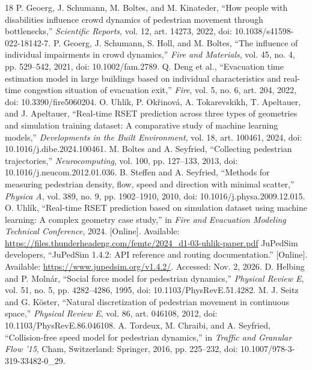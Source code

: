 \documentclass[conference]{IEEEtran}
\begin{document}
\begin{thebibliography}{18}
 P. Geoerg, J. Schumann, M. Boltes, and M. Kinateder, ``How people with disabilities influence crowd dynamics of pedestrian movement through bottlenecks,'' \textit{Scientific Reports}, vol. 12, art. 14273, 2022, doi: 10.1038/s41598-022-18142-7.
 P. Geoerg, J. Schumann, S. Holl, and M. Boltes, ``The influence of individual impairments in crowd dynamics,'' \textit{Fire and Materials}, vol. 45, no. 4, pp. 529--542, 2021, doi: 10.1002/fam.2789.
 Q. Deng et al., ``Evacuation time estimation model in large buildings based on individual characteristics and real-time congestion situation of evacuation exit,'' \textit{Fire}, vol. 5, no. 6, art. 204, 2022, doi: 10.3390/fire5060204.
 O. Uhl\'{i}k, P. Ok\v{r}inov\'{a}, A. Tokarevskikh, T. Apeltauer, and J. Apeltauer, ``Real-time RSET prediction across three types of geometries and simulation training dataset: A comparative study of machine learning models,'' \textit{Developments in the Built Environment}, vol. 18, art. 100461, 2024, doi: 10.1016/j.dibe.2024.100461.
 M. Boltes and A. Seyfried, ``Collecting pedestrian trajectories,'' \textit{Neurocomputing}, vol. 100, pp. 127--133, 2013, doi: 10.1016/j.neucom.2012.01.036.
 B. Steffen and A. Seyfried, ``Methods for measuring pedestrian density, flow, speed and direction with minimal scatter,'' \textit{Physica A}, vol. 389, no. 9, pp. 1902--1910, 2010, doi: 10.1016/j.physa.2009.12.015.
 O. Uhl\'{i}k, ``Real-time RSET prediction based on simulation dataset using machine learning: A complex geometry case study,'' in \textit{Fire and Evacuation Modeling Technical Conference}, 2024. [Online]. Available: \url{https://files.thunderheadeng.com/femtc/2024_d1-03-uhlik-paper.pdf}
 JuPedSim developers, ``JuPedSim 1.4.2: API reference and routing documentation.'' [Online]. Available: \url{https://www.jupedsim.org/v1.4.2/}. Accessed: Nov. 2, 2026.
 D. Helbing and P. Moln\'{a}r, ``Social force model for pedestrian dynamics,'' \textit{Physical Review E}, vol. 51, no. 5, pp. 4282--4286, 1995, doi: 10.1103/PhysRevE.51.4282.
 M. J. Seitz and G. K\"oster, ``Natural discretization of pedestrian movement in continuous space,'' \textit{Physical Review E}, vol. 86, art. 046108, 2012, doi: 10.1103/PhysRevE.86.046108.
 A. Tordeux, M. Chraibi, and A. Seyfried, ``Collision-free speed model for pedestrian dynamics,'' in \textit{Traffic and Granular Flow '15}, Cham, Switzerland: Springer, 2016, pp. 225--232, doi: 10.1007/978-3-319-33482-0\_29.

\end{thebibliography}
\end{document}
